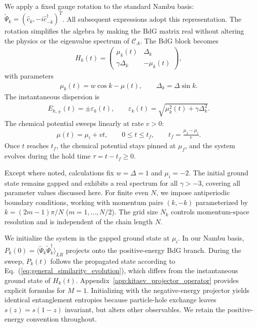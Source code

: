 \documentclass[aps,prb,reprint,superscriptaddress,amsmath,amssymb,floatfix]{revtex4-2}
\begin{document}
We apply a fixed gauge rotation to the standard Nambu basis: $\widetilde\Psi_k=(\hat c_k,-i\hat c_{-k}^{\dagger})^{T}$. All subsequent expressions adopt this representation. The rotation simplifies the algebra by making the BdG matrix real without altering the physics or the eigenvalue spectrum of $\mathcal C_A$. The BdG block becomes~\cite{Jafari2026,Li2018}
\begin{equation}
\begin{aligned}
H_k(t)= \begin{pmatrix} \mu_k(t) & \Delta_k\\ \gamma\Delta_k & -\mu_k(t) \end{pmatrix},
\end{aligned} \label{eq:Hk}
\end{equation}
with parameters
\begin{equation}
\begin{aligned}
\mu_k(t)=w\cos k-\mu(t), \qquad \Delta_k=\Delta\sin k .
\end{aligned} \label{eq:muk_deltak}
\end{equation}
The instantaneous dispersion is
\begin{equation}
\begin{aligned}
E_{k,\pm}(t)=\pm\varepsilon_k(t), \qquad \varepsilon_k(t)= \sqrt{\mu_k^2(t)+\gamma\Delta_k^2}.
\end{aligned} \label{eq:spectrum}
\end{equation}
The chemical potential sweeps linearly at rate $v>0$:
\begin{equation}
\begin{aligned}
\mu(t)=\mu_i+vt, \qquad 0\le t\le t_f, \qquad t_f=\frac{\mu_f-\mu_i}{v}.
\end{aligned} \label{eq:ramp}
\end{equation}
Once $t$ reaches $t_f$, the chemical potential stays pinned at $\mu_f$, and the system evolves during the hold time $\tau=t-t_f\ge0$.

Except where noted, calculations fix $w=\Delta=1$ and $\mu_i=-2$. The initial ground state remains gapped and exhibits a real spectrum for all $\gamma>-3$, covering all parameter values discussed here. For finite even $N$, we impose antiperiodic boundary conditions, working with momentum pairs $(k,-k)$ parameterized by $k=(2m-1)\pi/N$ ($m=1,\ldots,N/2$). The grid size $N_k$ controls momentum-space resolution and is independent of the chain length $N$.

We initialize the system in the gapped ground state at $\mu_i$. In our Nambu basis, $P_k(0)=\langle\widetilde\Psi_k\widetilde\Psi_k^\dagger\rangle_{LR}$ projects onto the positive-energy BdG branch. During the sweep, $P_k(t)$ follows the propagated state according to Eq.~(\ref{eq:general_similarity_evolution}), which differs from the instantaneous ground state of $H_k(t)$. Appendix~\ref{app:kitaev_projector_operator} provides explicit formulas for $M=1$. Initializing with the negative-energy projector yields identical entanglement entropies because particle-hole exchange leaves $s(z)=s(1-z)$ invariant, but alters other observables. We retain the positive-energy convention throughout.
\end{document}
